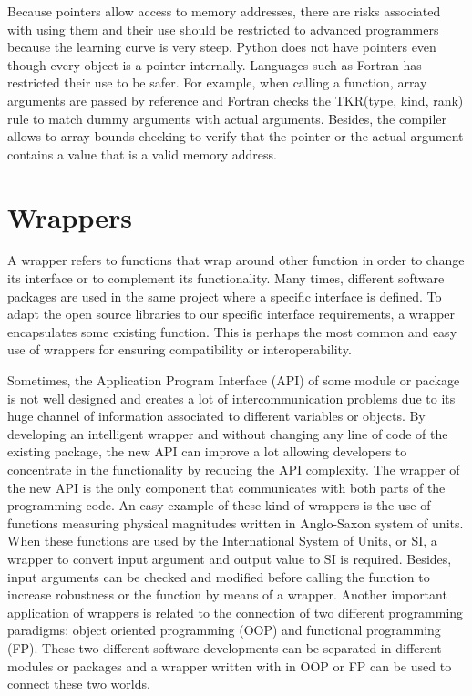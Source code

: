 Because pointers allow access to memory addresses, 
there are risks associated with using them and their use should be restricted to advanced 
programmers because the learning curve is very steep. 
Python does not have pointers even though every object is a pointer internally. 
Languages such as Fortran has restricted their use to be safer. For example, 
when calling a function, array arguments are passed by reference and
Fortran checks the TKR(type, kind, rank) rule to match dummy arguments with actual 
arguments. Besides, the compiler allows to array bounds checking
to verify that the pointer or the actual argument contains 
a value that is a valid memory address.


\newpage 
\section{Wrappers} 
A wrapper refers to functions 
that wrap around other function in order to change its interface or to complement 
its functionality. 
Many times, different software packages are used in the same project where a specific 
interface is defined. To adapt the open source libraries to our specific interface 
requirements, a wrapper encapsulates some existing function. 
This is perhaps the most common and easy use of wrappers for ensuring compatibility or 
interoperability. 

Sometimes, the Application Program Interface (API) of some module or package 
is not well designed and creates a lot of intercommunication problems due to its 
huge channel of information associated to different variables or objects. 
By developing an intelligent wrapper and without changing any line of code 
of the existing package, the new API can improve a lot allowing developers to concentrate
in the functionality by reducing the API complexity.  The wrapper of the new API 
is the only component that communicates  with both parts of the programming code.
An easy example of these kind of wrappers is the use of functions 
measuring physical magnitudes written in Anglo-Saxon system of units. 
When these functions are used by the  International System of Units, or SI, a wrapper 
to convert input argument and output value to SI is required. 
Besides, input arguments can be checked and modified before calling the function to increase robustness
or the function by means of a wrapper. 
Another important application of wrappers is related to the connection of two different programming 
paradigms: object oriented programming (OOP) and functional programming (FP). 
These two different software developments can be separated in different modules or packages 
and a wrapper written with in OOP or FP can be used to connect these two worlds. 



